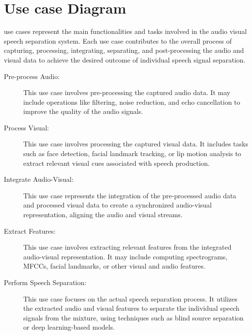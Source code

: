 \documentclass[12pt,a4paper]{report}
\begin{document}
\section{Use case Diagram}
use cases represent the main functionalities and tasks involved in the audio visual speech separation system. Each use case contributes to the overall process of capturing, processing, integrating, separating, and post-processing the audio and visual data to achieve the desired outcome of individual speech signal separation.
\begin{description}
    \item [Pre-process Audio:] This use case involves pre-processing the captured audio data. It may include operations like filtering, noise reduction, and echo cancellation to improve the quality of the audio signals.

\item [Process Visual:] This use case involves processing the captured visual data. It includes tasks such as face detection, facial landmark tracking, or lip motion analysis to extract relevant visual cues associated with speech production.

\item [Integrate Audio-Visual:] This use case represents the integration of the pre-processed audio data and processed visual data to create a synchronized audio-visual representation, aligning the audio and visual streams.

\item [Extract Features:] This use case involves extracting relevant features from the integrated audio-visual representation. It may include computing spectrograms, MFCCs, facial landmarks, or other visual and audio features.

\item [Perform Speech Separation:] This use case focuses on the actual speech separation process. It utilizes the extracted audio and visual features to separate the individual speech signals from the mixture, using techniques such as blind source separation or deep learning-based models.

\end{description}
\end{document}
